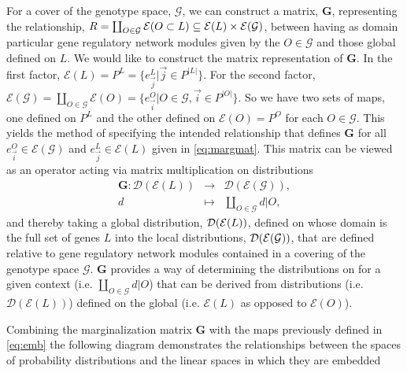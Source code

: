 For a cover of the genotype space, $\mathcal{G}$, we can construct a matrix, $\mathbf{G}$, representing the relationship, $R = \coprod_{O \in \mathcal{G}} \mathcal{E}(O \subset L) \subseteq \mathcal{E}(L) \times \mathcal{E} (\mathcal{G})$, between \gnpm{} having as domain particular gene regulatory network modules given by the $O \in \mathcal{G}$ and those global \gnpm{} defined on $L$. We would like to construct the matrix representation of $\mathbf{G}$. In the first factor, $\mathcal{E}(L) = P^L = \{e^{L}_{\vec{j}} | \vec{j} \in P^{|L|}\}$.
For the second factor, $ \mathcal{E}(\mathcal{G}) = \coprod_{O \in \mathcal{G}} \mathcal{E}(O) = \{e^O_{\vec{i}} | O \in \mathcal{G}, \vec{i} \in P^{|O|} \}$.
 So we have two sets of maps, one defined on $P^L$ and the other defined on $\mathcal{E}(O) = P^O$ for each $O \in \mathcal{G}$. This yields the method of specifying the intended relationship that defines $\mathbf{G}$ for all $e^O_{\vec{i}} \in \mathcal{E}(\mathcal{G})$ and $e^{L}_{\vec{j}} \in \mathcal{E}(L)$ given in \ref{eq:margmat}.
This matrix can be viewed as an operator acting via matrix multiplication on distributions
\begin{eqnarray*}
\mathbf{G} \colon \mathcal{D}(\mathcal{E}(L)) &\rightarrow& \mathcal{D}( \mathcal{E}(\mathcal{G})),\\
d &\mapsto& \coprod_{O \in \mathcal{G}} d|O,
\end{eqnarray*}
and thereby taking a global distribution, $\mathcal{D} (\mathcal{E}(L))$, defined on \gnpm{} whose domain is the full set of genes $L$ into the local distributions, $\mathcal{D} (\mathcal{E}(\mathcal{G}))$, that are defined relative to gene regulatory network modules contained in a covering of the genotype space $\mathcal{G}$. $\mathbf{G}$ provides a way of determining the distributions on \gnpm{} for a given context (i.e. $\coprod_{O \in \mathcal{G}} d|O$) that can be derived from distributions (i.e. $\mathcal{D} ( \mathcal{E}(L) )$) defined on the global \gnpm{} (i.e. $\mathcal{E}(L)$ as opposed to $\mathcal{E}(O)$).

Combining the marginalization matrix $\mathbf{G}$ with the maps previously defined in \ref{eq:emb} the following diagram demonstrates the relationships between the spaces of probability distributions and the linear spaces in which they are embedded

